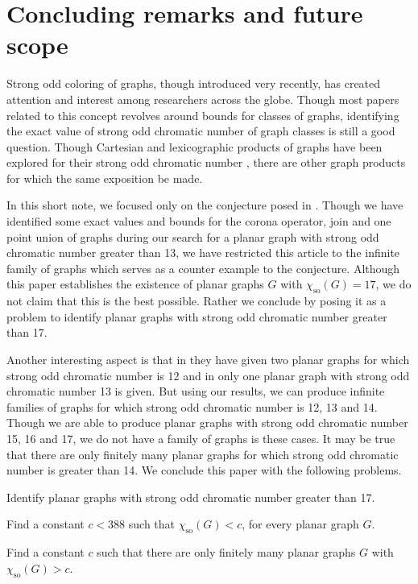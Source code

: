\documentclass[12pt,a4paper]{article}
\theoremstyle{definition}
\numberwithin{equation}{section}
\begin{document}
\section{Concluding remarks and future scope}
Strong odd coloring of graphs, though introduced very recently, has created attention and interest among researchers across the globe. Though most papers related to this concept revolves around bounds for classes of graphs, identifying the exact value of strong odd chromatic number of graph classes is still a good question. Though Cartesian and lexicographic products of graphs have been explored for their strong odd chromatic number \cite{Caro}, there are other graph products for which the same exposition be made. 

In this short note, we focused only on the conjecture posed in \cite{Pang}. Though we have identified some exact values and bounds for the corona operator, join and one point union of graphs during our search for a planar graph with strong odd chromatic number greater than 13, we have restricted this article to the infinite family of graphs which serves as a counter example to the conjecture. Although this paper establishes the existence of planar graphs $G$ with $\chi_\text{so}(G)=17$, we do not claim that this is the best possible. Rather we conclude by posing it as a problem to identify planar graphs with strong odd chromatic number greater than 17.

Another interesting aspect is that in \cite{Caro} they have given two planar graphs for which strong odd chromatic number is 12 and in \cite{Pang} only one planar graph with strong odd chromatic number 13 is given. But using our results, we can produce infinite families of graphs for which strong odd chromatic number is 12, 13 and 14. Though we are able to produce planar graphs with strong odd chromatic number 15, 16 and 17, we do not have a family of graphs is these cases. It may be true that there are only finitely many planar graphs for which strong odd chromatic number is greater than 14. We conclude this paper with the following problems.

\vspace{0.5cm}
 Identify planar graphs with strong odd chromatic number greater than 17.

\vspace{0.5cm}
 Find a constant $c < 388$ such that $\chi_\text{so}(G) < c$, for every planar graph $G$.

\vspace{0.5cm}
 Find a constant $c$ such that there are only finitely many planar graphs $G$ with $\chi_\text{so}(G) > c$.
\end{document}

